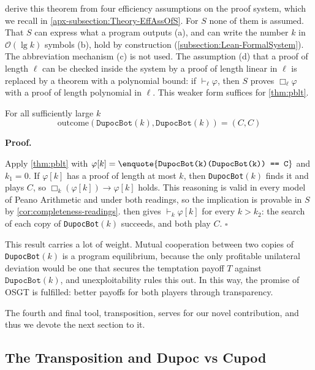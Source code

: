 \documentclass[twoside,11pt]{article}
\renewcommand{\BlackBox}{\ensuremath{\square}}
\renewenvironment{proof}[1][Proof]{%
  \par\noindent\textbf{#1.}\enspace\ignorespaces
}{%
  \ifhmode\unskip\nobreak\hfill\quad\else\noindent\hfill\fi
  \BlackBox\par\addvspace{2mm}%
}
\begin{document}
\citet[Appendix~B]{Critch} derive this theorem from four efficiency assumptions on the proof system, which we recall in \cref{apx-subsection:Theory-EffAssOfS}. For $S$ none of them is assumed. That $S$ can express what a program outputs (a), and can write the number $k$ in $\mathcal{O}(\lg k)$ symbols (b), hold by construction (\cref{subsection:Lean-FormalSystem}). The abbreviation mechanism (c) is not used. The assumption (d) that a proof of length $\ell$ can be checked inside the system by a proof of length linear in $\ell$ is replaced by a theorem with a polynomial bound: if $\vdash_\ell \varphi$, then $S$ proves $\Box_\ell\varphi$ with a proof of length polynomial in $\ell$. This weaker form suffices for \cref{thm:pblt}.
\begin{theorem}\label{thm:dupoc-selfplay}
For all sufficiently large $k$ \[
\mathrm{outcome}(\texttt{DupocBot}(k), \texttt{DupocBot}(k)) = (C, C)
\]
\end{theorem}
\begin{proof}
Apply \cref{thm:pblt} with $\varphi[k] = \text{\enquote{\texttt{DupocBot(k)(DupocBot(k)) == C}}}$ and $k_1 = 0$. If $\varphi[k]$ has a proof of length at most $k$, then \texttt{DupocBot}$(k)$ finds it and plays $C$, so $\Box_{k}(\varphi[k]) \to \varphi[k]$ holds. This reasoning is valid in every model of Peano Arithmetic and under both readings, so the implication is provable in $S$ by \cref{cor:completeness-readings}.  then gives $\vdash_k \varphi[k]$ for every $k > k_2$: the search of each copy of \texttt{DupocBot}$(k)$ succeeds, and both play $C$.
\end{proof}
This result carries a lot of weight. Mutual cooperation between two copies of \texttt{DupocBot}$(k)$ is a program equilibrium, because the only profitable unilateral deviation would be one that secures the temptation payoff $T$ against $\texttt{DupocBot}(k)$, and unexploitability rules this out. In this way, the promise of OSGT is fulfilled: better payoffs for both players through transparency.

The fourth and final tool, transposition, serves for our novel contribution, and thus we devote the next section to it.




\subsection{The Transposition and Dupoc vs Cupod}
\label{subsection:Theory-Transposition}
\end{document}
